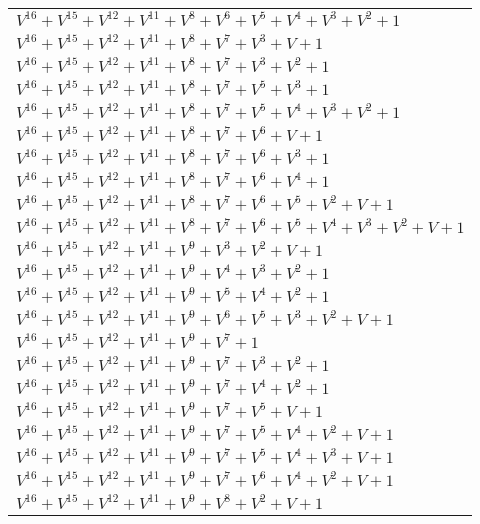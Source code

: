\documentclass[12pt]{article}
\begin{document}
\begin{adjustwidth}{-4cm}{}
\begin{center}
\begin{longtable}{|l|}
$V^{16}  +V^{15}  +V^{12}  +V^{11}  +V^{8}  +V^{6}  +V^{5}  +V^{4}  +V^{3}  +V^{2}  + 1$ \\
$V^{16}  +V^{15}  +V^{12}  +V^{11}  +V^{8}  +V^{7}  +V^{3}  + V + 1$ \\
$V^{16}  +V^{15}  +V^{12}  +V^{11}  +V^{8}  +V^{7}  +V^{3}  +V^{2}  + 1$ \\
$V^{16}  +V^{15}  +V^{12}  +V^{11}  +V^{8}  +V^{7}  +V^{5}  +V^{3}  + 1$ \\
$V^{16}  +V^{15}  +V^{12}  +V^{11}  +V^{8}  +V^{7}  +V^{5}  +V^{4}  +V^{3}  +V^{2}  + 1$ \\
$V^{16}  +V^{15}  +V^{12}  +V^{11}  +V^{8}  +V^{7}  +V^{6}  + V + 1$ \\
$V^{16}  +V^{15}  +V^{12}  +V^{11}  +V^{8}  +V^{7}  +V^{6}  +V^{3}  + 1$ \\
$V^{16}  +V^{15}  +V^{12}  +V^{11}  +V^{8}  +V^{7}  +V^{6}  +V^{4}  + 1$ \\
$V^{16}  +V^{15}  +V^{12}  +V^{11}  +V^{8}  +V^{7}  +V^{6}  +V^{5}  +V^{2}  + V + 1$ \\
$V^{16}  +V^{15}  +V^{12}  +V^{11}  +V^{8}  +V^{7}  +V^{6}  +V^{5}  +V^{4}  +V^{3}  +V^{2}  + V + 1$ \\
$V^{16}  +V^{15}  +V^{12}  +V^{11}  +V^{9}  +V^{3}  +V^{2}  + V + 1$ \\
$V^{16}  +V^{15}  +V^{12}  +V^{11}  +V^{9}  +V^{4}  +V^{3}  +V^{2}  + 1$ \\
$V^{16}  +V^{15}  +V^{12}  +V^{11}  +V^{9}  +V^{5}  +V^{4}  +V^{2}  + 1$ \\
$V^{16}  +V^{15}  +V^{12}  +V^{11}  +V^{9}  +V^{6}  +V^{5}  +V^{3}  +V^{2}  + V + 1$ \\
$V^{16}  +V^{15}  +V^{12}  +V^{11}  +V^{9}  +V^{7}  + 1$ \\
$V^{16}  +V^{15}  +V^{12}  +V^{11}  +V^{9}  +V^{7}  +V^{3}  +V^{2}  + 1$ \\
$V^{16}  +V^{15}  +V^{12}  +V^{11}  +V^{9}  +V^{7}  +V^{4}  +V^{2}  + 1$ \\
$V^{16}  +V^{15}  +V^{12}  +V^{11}  +V^{9}  +V^{7}  +V^{5}  + V + 1$ \\
$V^{16}  +V^{15}  +V^{12}  +V^{11}  +V^{9}  +V^{7}  +V^{5}  +V^{4}  +V^{2}  + V + 1$ \\
$V^{16}  +V^{15}  +V^{12}  +V^{11}  +V^{9}  +V^{7}  +V^{5}  +V^{4}  +V^{3}  + V + 1$ \\
$V^{16}  +V^{15}  +V^{12}  +V^{11}  +V^{9}  +V^{7}  +V^{6}  +V^{4}  +V^{2}  + V + 1$ \\
$V^{16}  +V^{15}  +V^{12}  +V^{11}  +V^{9}  +V^{8}  +V^{2}  + V + 1$ \\

\end{longtable}
\end{center}
\end{adjustwidth}
\end{document}
